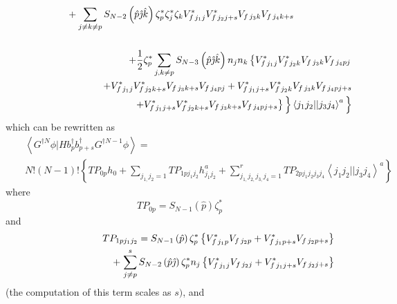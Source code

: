 \documentclass[aps,preprint]{revtex4}
\begin{document}
\begin{eqnarray}
&&\left. {}\right. \qquad +\sum_{j\neq k\neq p}S_{N-2}\left( \hat{p}\hat{%
\jmath}\hat{k}\right) \zeta _{p}^{\ast }\zeta _{j}^{\ast }\zeta
_{k}V_{f\,j_{1}j}^{\ast }V_{f\,j_{2}j+s}^{\ast
}V_{f\,j_{3}k}V_{f\,j_{4}k+s}\qquad \qquad \qquad   \notag \\
&&  \notag \\
&&\qquad \qquad +\frac{1}{2}\zeta _{p}^{\ast }\sum_{j,k\neq p}S_{N-3}\left( 
\hat{p}\hat{\jmath}\hat{k}\right) n_{j}n_{k}\left\{ V_{f\,j_{1}j}^{\ast
}V_{f\,j_{2}k}^{\ast }V_{f\,j_{3}k}V_{f\,j_{4}pj}\right.   \notag \\
&&\qquad \qquad \qquad +V_{f\,j_{1}j}^{\ast }V_{f\,j_{2}k+s}^{\ast
}V_{f\,j_{3}k+s}V_{f\,j_{4}pj}+V_{f\,j_{1}j+s}^{\ast }V_{f\,j_{2}k}^{\ast
}V_{f\,j_{3}k}V_{f\,j_{4}pj+s}  \notag \\
&&\qquad \qquad \qquad \qquad \qquad \qquad \left. \left. \left.
+V_{f\,j_{1}j+s}^{\ast }V_{f\,j_{2}k+s}^{\ast
}V_{f\,j_{3}k+s}V_{f\,j_{4}pj+s}\right\} \underset{}{\overset{}{}}\right\}
\left\langle j_{1}j_{2}||j_{3}j_{4}\right\rangle ^{a}%
\begin{array}{c}
\end{array}%
\right\} 
\end{eqnarray}%
which can be rewritten as 
\begin{eqnarray*}
&&\left\langle G^{\dagger N}\phi |Hb_{p}^{\dagger }b_{p+s}^{\dagger
}G^{\dagger N-1}\phi \right\rangle = \\
&&N!\left( N-1\right) !\left\{
TP_{0p}h_{0}+\sum_{j_{1,}j_{2}=1}TP_{1pj_{1}j_{2}}h_{j_{1}j_{2}}^{a}+%
\sum_{j_{1,}j_{2,}j_{3,}j_{4}=1}^{r}TP_{2pj_{1}j_{2}j_{3}j_{4}}\left\langle
j_{1}j_{2}||j_{3}j_{4}\right\rangle ^{a}\right\} 
\end{eqnarray*}%
where%
\begin{equation}
TP_{0p}=S_{N-1}\left( \hat{p}\right) \zeta _{p}^{\ast }
\end{equation}%
and 
\begin{eqnarray}
&&TP_{1pj_{1}j_{2}}=S_{N-1}\left( \hat{p}\right) \zeta _{p}^{\ast }\left\{
V_{f\,j_{1}p}^{\ast }V_{f\,j_{2}p}+V_{f\,j_{1}p+s}^{\ast
}V_{f\,j_{2}p+s}\right\}   \notag \\
&&\qquad \qquad \qquad \qquad \left. +\right. \sum_{j\neq
p}^{s}S_{N-2}\left( \hat{p}\hat{\jmath}\right) \zeta _{p}^{\ast
}n_{j}\left\{ V_{f\,j_{1}j}^{\ast }V_{f\,j_{2}j}+V_{f\,j_{1}j+s}^{\ast
}V_{f\,j_{2}j+s}\right\} 
\end{eqnarray}%
(the computation of this term scales as $s)$, and 
\end{document}
